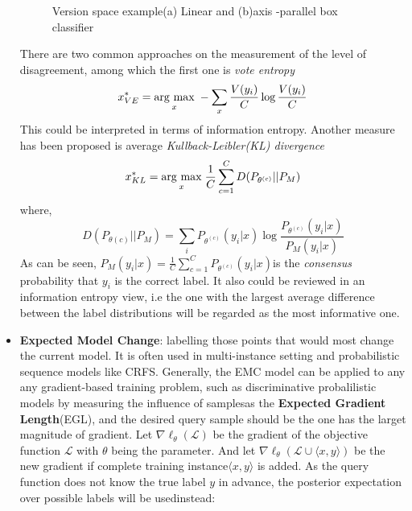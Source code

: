 \begin{itemize}
\begin{figure}[htbp]
   \caption{Version space example(a) Linear and (b)axis -parallel box classifier}
  \end{figure}\label{vs}
  
  There are two common approaches on the measurement of the level of disagreement, among which the first one is \textit{vote entropy}\colorbox{green}{\cite{Settles2010}}
  \begin{equation}
    x_{VE}^{*}=\underset{x}{\operatorname{arg}\,\operatorname{max}}\; -\sum\limits_{x}\frac{V(y_i)}{C}\log{\frac{V(y_i)}{C}}  
  \end{equation}
  This could be interpreted in terms of information entropy. Another measure has been proposed is average \textit{Kullback-Leibler(KL) divergence\colorbox{green}{\cite{Prince2004}}}
  \begin{equation}
    x_{KL}^{*}=\underset{x}{\operatorname{arg}\,\operatorname{max}}\;\frac{1}{C}\sum\limits_{c=1}^{C}D(P_{\theta^{(c)}}||P_M)
  \end{equation}
  where,
  \begin{equation}
    D(P_{\theta(c)}||P_M)=\sum\limits_{i}P_{\theta^{(c)}}(y_i|x)\log \frac{P_{\theta^{(c)}}(y_i|x)}{P_M(y_i|x)}
  \end{equation}
  As can be seen, $P_M(y_i|x)=\frac{1}{C}\sum^{C}_{c=1}P_{\theta^{(c)}}(y_i|x)$is the \textit{consensus} probability that $y_i$ is the correct label. It also could be reviewed in an information entropy view, i.e  the one with the largest average difference between the label distributions will be regarded as the most informative one. 
  \item \textbf{Expected Model Change}: labelling those points that would most change the current model. It is often used in multi-instance setting and probabilistic sequence models like CRFS. Generally, the EMC model can be applied to any any gradient-based training problem, such as discriminative probalilistic models by measuring the influence of samples\colorbox{green}{\cite{Settles2010}}as the \textbf{Expected Gradient Length}(EGL), and the desired query sample should be the one has the larget magnitude of gradient. Let $\nabla\ell_\theta(\mathcal{L})$ be the gradient of the objective function $\mathcal{L}$ with $\theta$ being the parameter. And let $\nabla\ell_\theta(\mathcal{L}\cup\langle x,y\rangle )$ be the new gradient if complete training instance$\langle x,y \rangle$ is added. As the query function does not know the true label $y$ in advance, the posterior expectation over possible labels will be usedinstead\colorbox{green}{\cite{Settles2010}}:

\end{itemize}
